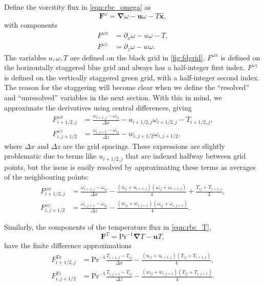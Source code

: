 \documentclass{article}
\renewcommand\vec{\bm}
\newcommand{\uvec}[1]{\vec{\hat{#1}}}
\newcommand{\grad}{\vec{\nabla}}
\newcommand{\prandtl}{\ensuremath{\mathrm{Pr}}}
\begin{document}
Define the vorcitity flux in \autoref{eqn:rbc_omega} as
\[
    \vec{F}^\omega = \grad \omega - \vec{u} \omega - T \uvec{x},
\]
with components
\begin{align*}
    F^{\omega x} &= \partial_x \omega - u \omega - T, \\
    F^{\omega z} &= \partial_z \omega - w \omega.
\end{align*}
The variables $u,\omega,T$ are defined on the black grid in
\autoref{fig:fdgrid}. $F^{\omega x}$ is defined on the horizontally staggered
blue grid and always has a half-integer first index. $F^{\omega z}$ is
defined on the vertically staggered green grid, with a half-integer
second index. The reason for the staggering will become clear when
we define the ``resolved'' and ``unresolved'' variables in the next section.
With this in mind, we approximate the derivatives using
central differences, giving
\begin{align*}
    F^{\omega x}_{i+1/2,j}
        &= \frac{\omega_{i+1,j} - \omega_{ij}}{\Delta x}
        - u_{i+1/2,j} \omega_{i+1/2,j} - T_{i+1/2,j}, \\
    F^{\omega z}_{i,j+1/2}
    &= \frac{\omega_{i,j+1} - \omega_{ij}}{\Delta z}
    - w_{i,j+1/2} \omega_{i,j+1/2},
\end{align*}
where $\Delta x$ and $\Delta z$ are the grid spacings. These expressions are
slightly problematic due to terms like $u_{i+1/2,j}$ that are indexed halfway
between grid points, but the issue is easily resolved by approximating these
terms as averages of the neighbouring points:
\begin{equation} \label{eqn:omega_flux}
\begin{aligned}
    F^{\omega x}_{i+1/2,j}
        &= \frac{\omega_{i+1,j} - \omega_{ij}}{\Delta x}
        - \frac{(u_{ij} + u_{i+1,j})(\omega_{ij} + \omega_{i+1,j})}{4}
        + \frac{T_{ij} + T_{i+1,j}}{2}, \\
    F^{\omega z}_{i,j+1/2}
    &= \frac{\omega_{i,j+1} - \omega_{ij}}{\Delta z}
    - \frac{(w_{ij} + w_{i,j+1})(\omega_{ij} + \omega_{i,j+1})}{4}.
\end{aligned}
\end{equation}

Similarly, the components of the temperature flux in \autoref{eqn:rbc_T},
\[
    \vec{F}^T = \prandtl^{-1} \grad T - \vec{u} T,
\]
have the finite difference approximations
\begin{align*}
    F^{Tx}_{i+1/2,j}
        &= \prandtl^{-1} \frac{T_{i+1,j} - T_{ij}}{\Delta x}
        - \frac{(u_{ij} + u_{i+1,j})(T_{ij} + T_{i+1,j})}{4}, \\
    F^{Tz}_{i,j+1/2}
    &= \prandtl^{-1} \frac{T_{i,j+1} - T_{ij}}{\Delta z}
    - \frac{(w_{ij} + w_{i,j+1})(T_{ij} + T_{i,j+1})}{4}.
\end{align*}
\end{document}
